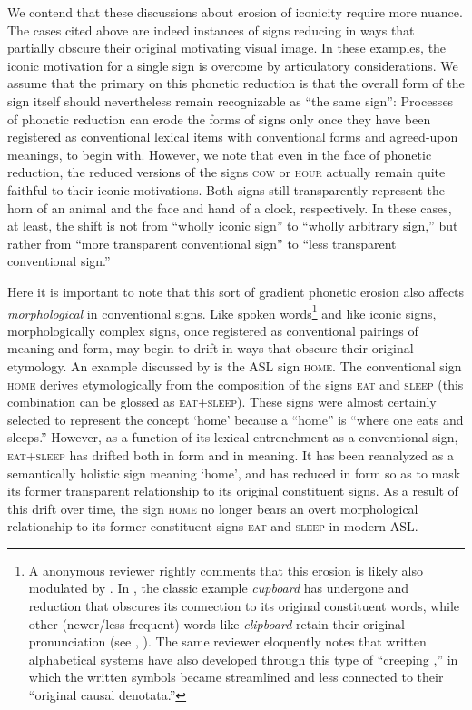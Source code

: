 \documentclass[output=paper,
modfonts
]{LSP/langsci}
\begin{document}
  We contend that these discussions about erosion of iconicity require more nuance. The cases cited above are indeed instances of signs reducing in ways that partially obscure their original motivating visual image. In these examples, the iconic motivation for a single sign is overcome by articulatory considerations. We assume that the primary  on this phonetic reduction is that the overall form of the sign itself should nevertheless remain recognizable as ``the same sign'': Processes of phonetic reduction can erode the forms of signs only once they have been registered as conventional lexical items with conventional forms and agreed-upon meanings, to begin with. However, we note that even in the face of phonetic reduction, the reduced versions of the signs \textsc{cow} or \textsc{hour} actually remain quite faithful to their iconic motivations. Both signs still transparently represent the horn of an animal and the face and hand of a clock, respectively. In these cases, at least, the shift is not from ``wholly iconic sign'' to ``wholly arbitrary sign,'' but rather from ``more transparent conventional sign'' to ``less transparent conventional sign.''

  Here it is important to note that this sort of gradient phonetic erosion also affects \textit{morphological}  in conventional signs. Like spoken words\footnote{A anonymous reviewer rightly comments that this erosion is likely also modulated by . In , the classic example \textit{cupboard} has undergone  and reduction that obscures its connection to its original constituent words, while other (newer/less frequent) words like \textit{clipboard} retain their original  pronunciation (see \citealt{Zipf1935}, \citealt{Bybee2001}). The same reviewer eloquently notes that written alphabetical systems have also developed through this type of ``creeping ,'' in which the written symbols became streamlined and less connected to their ``original causal denotata.''} and like iconic signs, morphologically complex signs, once registered as conventional pairings of meaning and form, may begin to drift in ways that obscure their original etymology. An example discussed by \citet[707]{Frishberg1975} is the ASL sign \textsc{home}. The conventional sign \textsc{home} derives etymologically from the composition of the signs \textsc{eat} and \textsc{sleep} (this combination can be glossed as \textsc{eat+sleep)}. These signs were almost certainly selected to represent the concept `home' because a ``home'' is ``where one eats and sleeps.'' However, as a function of its lexical entrenchment as a conventional sign, \textsc{eat+sleep} has drifted both in form and in meaning. It has been reanalyzed as a semantically holistic sign meaning `home', and has reduced in form so as to mask its former transparent relationship to its original constituent signs. As a result of this drift over time, the sign \textsc{home} no longer bears an overt morphological relationship to its former constituent signs \textsc{eat} and \textsc{sleep} in modern ASL.
\end{document}
